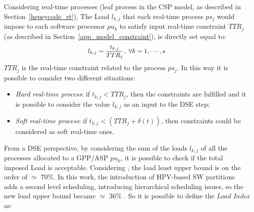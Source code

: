%
Considering real-time processes (leaf process in the CSP model, as described in Section~\ref{hepsycode_rt}), The Load $l_{k,j}$ that each real-time process $ps_j$ would impose to each software processor $pu_k$ to satisfy input real-time constraint $TTR_j$ (as described in Section~\ref{app_model_constraint}), is directly set equal to:
%
\begin{equation} \label{eq14}
\small
\begin{aligned}
    l_{k,j} = \frac{t_{k,j}}{TTR_j}, \ \forall k = 1, \cdots, s
\end{aligned}
\end{equation}
%
$TTR_j$ is the real-time constraint related to the process $ps_j$. In this way it is possible to consider two different situations:
%
\begin{itemize}
    \item \textit{Hard real-time process}: if $t_{k,j} < TTR_j$, then the constraints are fulfilled and it is possible to consider the value $l_{k,j}$ as an input to the DSE step;
    \item \textit{Soft real-time process}: if $t_{k,j} < (TTR_j + \delta (t) )$, then constraints could be considered as soft real-time ones.
\end{itemize}
%
From a DSE perspective, by considering the sum of the loads $l_{k,j}$ of all the processes allocated to a GPP/ASP \textit{$pu_{k}$}, it is possible to check if the total imposed Load is acceptable. Considering \cite{bib28}, the load least upper bound is on the order of $\simeq$ 70\%. In this work, the introduction of HPV-based SW partitions adds a second level scheduling, introducing hierarchical scheduling issues, so the new load upper bound became $\simeq$ 36\% \cite{bib28_new}. So it is possible to define the \textit{Load Index} as:
%
